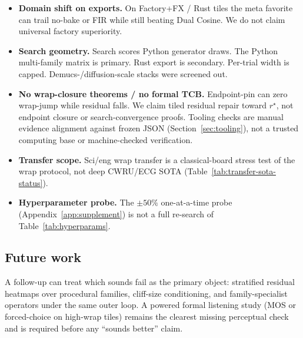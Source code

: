 \begin{itemize}
    Cycle-GAN / BeatDiff / real KIT--PMU remain incomplete where noted
    (Table~\ref{tab:transfer-sota-status}).
  \item \textbf{Domain shift on exports.}
    On Factory+FX / Rust tiles the meta favorite can trail no-bake or FIR while still beating Dual Cosine.
    We do not claim universal factory superiority.
  \item \textbf{Search geometry.}
    Search scores Python generator draws.
    The Python multi-family matrix is primary. Rust export is secondary.
    Per-trial width is capped. Demucs-/diffusion-scale stacks were screened out.
  \item \textbf{No wrap-closure theorems / no formal TCB.}
    Endpoint-pin can zero wrap-jump while residual falls.
    We claim tiled residual repair toward $r^{\star}$, not endpoint closure or search-convergence proofs.
    Tooling checks are manual evidence alignment against frozen JSON (Section~\ref{sec:tooling}), not a trusted computing base or machine-checked verification.
  \item \textbf{Transfer scope.}
    Sci/eng wrap transfer is a classical-board stress test of the wrap protocol, not deep CWRU/ECG SOTA
    (Table~\ref{tab:transfer-sota-status}).
  \item \textbf{Hyperparameter probe.}
    The $\pm 50\%$ one-at-a-time probe (Appendix~\ref{app:supplement}) is not a full re-search of Table~\ref{tab:hyperparams}.
\end{itemize}

\subsection{Future work}
\label{sec:outlook}

A follow-up can treat which sounds fail as the primary object: stratified residual heatmaps over procedural families, cliff-size conditioning, and family-specialist operators under the same outer loop.
A powered formal listening study (MOS or forced-choice on high-wrap tiles) remains the clearest missing perceptual check and is required before any ``sounds better'' claim.
